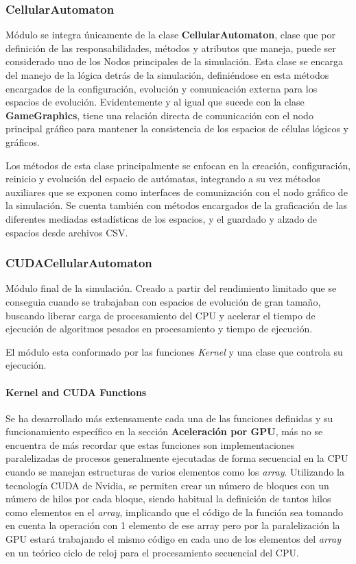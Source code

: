 \documentclass[]{article}
\begin{document}
			
			
		\subsubsection{CellularAutomaton}
			Módulo se integra únicamente de la clase \textbf{CellularAutomaton}, clase que por definición de las responsabilidades, métodos y atributos que maneja, puede ser considerado uno de los Nodos principales de la simulación. Esta clase se encarga del manejo de la lógica detrás de la simulación, definiéndose en esta métodos encargados de la configuración, evolución y comunicación externa para los espacios de evolución. Evidentemente y al igual que sucede con la clase \textbf{GameGraphics}, tiene una relación directa de comunicación con el nodo principal gráfico para mantener la consistencia de los espacios de células lógicos y gráficos.
			
			Los métodos de esta clase principalmente se enfocan en la creación, configuración, reinicio y evolución del espacio de autómatas, integrando a su vez métodos auxiliares que se exponen como interfaces de comunización con el nodo gráfico de la simulación.
			Se cuenta también con métodos encargados de la graficación de las diferentes mediadas estadísticas de los espacios, y el guardado y alzado de espacios desde archivos CSV.
			
			
			
		\subsubsection{CUDACellularAutomaton}
			Módulo final de la simulación. Creado a partir del rendimiento limitado que se conseguia cuando se trabajaban con espacios de evolución de gran tamaño, buscando liberar carga de procesamiento del CPU y acelerar el tiempo de ejecución de algoritmos pesados en procesamiento y tiempo de ejecución.
			
			El módulo esta conformado por las funciones \textit{Kernel} y una clase que controla su ejecución.
			
			\paragraph{Kernel and CUDA Functions}
				Se ha desarrollado más extensamente cada una de las funciones definidas y su funcionamiento específico en la sección \textbf{Aceleración por GPU}, más no se encuentra de más recordar que estas funciones son implementaciones paralelizadas de procesos generalmente ejecutadas de forma secuencial en la CPU cuando se manejan estructuras de varios elementos como los \textit{array}. Utilizando la tecnología CUDA de Nvidia, se permiten crear un número de bloques con un número de hilos por cada bloque, siendo habitual la definición de tantos hilos como elementos en el \textit{array}, implicando que el código de la función sea tomando en cuenta la operación con 1 elemento de ese array pero por la paralelización la GPU estará trabajando el mismo código en cada uno de los elementos del \textit{array} en un teórico ciclo de reloj para el procesamiento secuencial del CPU.
			
\end{document}
